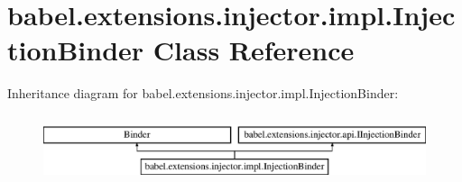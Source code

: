 \hypertarget{classbabel_1_1extensions_1_1injector_1_1impl_1_1_injection_binder}{\section{babel.\-extensions.\-injector.\-impl.\-Injection\-Binder Class Reference}
\label{classbabel_1_1extensions_1_1injector_1_1impl_1_1_injection_binder}
}
Inheritance diagram for babel.\-extensions.\-injector.\-impl.\-Injection\-Binder\-:\begin{figure}[H]
\begin{center}
\leavevmode
\includegraphics[height=2.000000cm]{classbabel_1_1extensions_1_1injector_1_1impl_1_1_injection_binder}
\end{center}
\end{figure}
